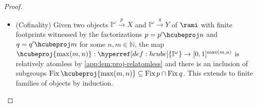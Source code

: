 \documentclass[
  sigconf,
  screen, ]{acmart}
\theoremstyle{definition}
\newcommand\img{\operatorname{im}}
\newcommand\Aut{\operatorname{Aut}}
\newcommand\N{\mathbb N}
\newcommand\nref[2]{\hyperref[#1]{#2}} \newcommand\checkhigh{{\huge{\color{red}\textbf{TODO: check}}}}
\newcommand\measalg{\operatorname{\nref{app:cons:measalg}{alg}}}
\newcommand\texhcube{{{{\mathbb I}^\omega}}}
\newcommand\hcube{{\nref{def:hcube}{\texhcube}}}
\newcommand\texStdMble{\mathbf{EMS}_{\rm std}}
\newcommand\StdMble{{\nref{def:mblecat}{\texStdMble}}}
\newcommand\StdMbleAlg{{\nref{def:StdMbleAlg}{\mathbf{MbleAlg}_{\rm std}}}}
\newcommand\Fix{\operatorname{Fix}}
\begin{document}
\begin{proof}
\begin{itemize}
      $p$ factors through $\hcubeproj n$ and $q$ through $\hcubeproj m$
      for some $n,m$.
      Therefore, $p$ and $q$ also both factor through
      $\hcubeproj{\max(m,n)+1}$,
      so $p = p'\hcubeproj{\max(m,n)+1}$
      and $q = q'\hcubeproj{\max(m,n)+1}$
      for some $p' : [0,1]^{\max(m,n)+1}\to X$
      and $q' : [0,1]^{\max(m,n)+1}\to Y$.
      The inclusion $\Fix p \subseteq\Fix q$
      implies every width-$({\max(m,n)+1})$ auto
      fixing $p$ fixes $q$,
      so $p(\embedmap{\pi}) = p$
      implies $q(\embedmap{\pi}) = q$
      for all autos $\pi$ of $[0,1]^{\max(m,n)+1}$.
      Since $p(\embedmap{\pi}) = p'\hcubeproj{\max(m,n)+1}(\embedmap{\pi})
      =p'\pi\hcubeproj{\max(m,n)+1}$
      and similarly $q(\embedmap{\pi}) = q'\hcubeproj{\max(m,n)+1}(\embedmap{\pi})
      =q'\pi\hcubeproj{\max(m,n)+1}$,
      this implies $p'\pi = p'$ and $q'\pi = q'$
      for all automorphisms $\pi$ of $[0,1]^{\max(m,n)+1}$,
      or in other words that $\Fix_{\Aut{[0,1]^{\max(m,n)+1}}}p'
      \subseteq\Fix_{\Aut{[0,1]^{\max(m,n)+1}}}q'$.
      The maps $p'$ and $q'$
      induce corresponding 
      subalgebras $\img(\measalg(p'))$ and $\img(\measalg(q'))$
      of ${[0,1]^{\max(m,n)+1}}$,
      and ${[0,1]^{\max(m,n)+1}}$ is relatively atomless
      over these subalgebras by \cref{app:lem:proj-relatomless},
      so \cref{app:lem:mble-distinguishability} applies,
      giving an inclusion of subalgebras $\img(\measalg(q'))\subseteq\img(\measalg(p'))$.
      This in turn gives a $\StdMbleAlg$-morphism $\measalg(Y)\to\measalg(X)$
      factoring $\measalg(q')$ through $\measalg(p')$
      (since $\measalg(X)\cong\img(\measalg(p'))$
      and $\measalg(Y)\cong\img(\measalg(q'))$),
      which by \cref{app:lem:mblecat-dual}
      gives a $\StdMble$-map $X\to Y$ factoring $q'$ through $p'$
      and hence also $q$ through $p$ as required.
    \item (Cofinality)
      Given two objects $\hcube\xrightarrow p X$
      and $\hcube\xrightarrow q Y$ of $\rami$
      with finite footprints witnessed by the factorizations
      $p = p' \hcubeproj n$
      and $q = q'\hcubeproj m$ for some $n,m\in \N$,
      the map $\hcubeproj{\max(m,n)} : \hcube\to[0,1]^{\max(m,n)}$
      is relatively atomless by \cref{app:lem:proj-relatomless}
      and there is an inclusion of subgroups
      $\Fix {\hcubeproj {\max(m,n)}}\subseteq \Fix p\cap \Fix q$.
      This extends to finite families of objects by induction.
  \end{itemize}
\end{proof}
\end{document}
